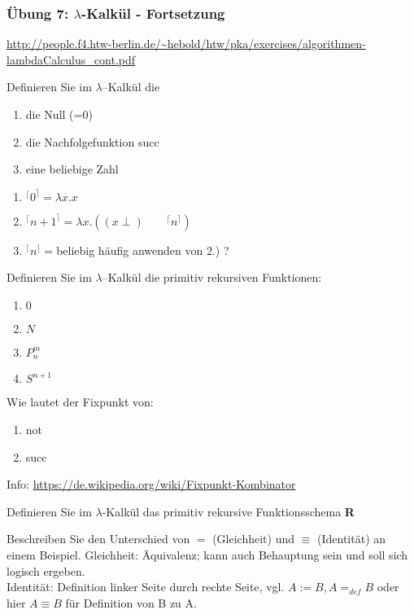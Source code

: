 \begin{card}
	\frametitle{Übung 7: $\lambda$-Kalkül - Fortsetzung}
	\url{http://people.f4.htw-berlin.de/~hebold/htw/pka/exercises/algorithmen-lambdaCalculus_cont.pdf}
\end{card}

\begin{card}
	Definieren Sie im $\lambda$–Kalkül die
	\begin{enumerate}
	\item die Null (=0)
	\item die Nachfolgefunktion succ
	\item eine beliebige Zahl
	\end{enumerate}
	\hr
	\begin{enumerate}
	\item $^\lceil 0 ^\rceil = \lambda x.x$
	\item $^\lceil n+1 ^\rceil = \lambda x.((x \perp )\qquad ^\lceil n ^\rceil)$
	\item $^\lceil n ^\rceil = $beliebig häufig anwenden von 2.) ?
	\end{enumerate}
\end{card}

\begin{card}
	Definieren Sie im $\lambda$–Kalkül die primitiv rekursiven Funktionen: 
	\begin{enumerate}
	\item $0$
	\item $N$
	\item $P^m_n$
	\item $S^{n+1}$
	\end{enumerate}
\end{card}

\begin{card}
	Wie lautet der Fixpunkt von: 
	\begin{enumerate}
	\item not
	\item succ
	\end{enumerate}
	\hr
	Info: \url{https://de.wikipedia.org/wiki/Fixpunkt-Kombinator}
\end{card}

\begin{card}
	Definieren Sie im $\lambda$-Kalkül das primitiv rekursive Funktionsschema	\textbf{R}
\end{card}

\begin{card}
	Beschreiben Sie den Unterschied von $=$ (Gleichheit) und $\equiv$ (Identität) an einem Beispiel.
	\hr
	Gleichheit: Äquivalenz; kann auch Behauptung sein und soll sich logisch ergeben.\\
	Identität: Definition linker Seite durch rechte Seite, vgl. $A := B, A=_{def} B$ oder hier $A \equiv B $ für Definition von B zu A.
\end{card}

